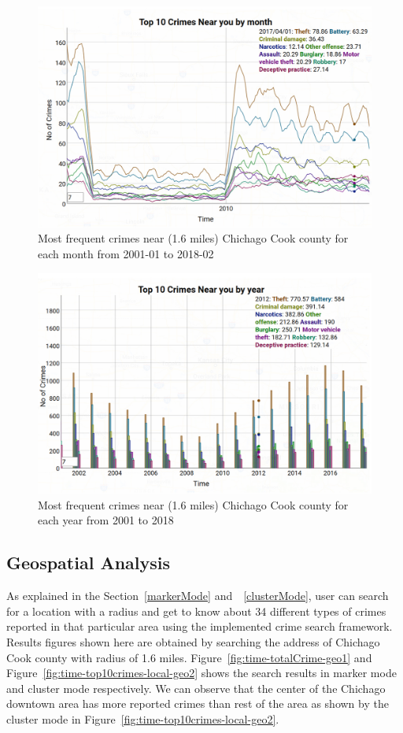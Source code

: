 \begin{figure}[htb]
	\centering\includegraphics[width=\columnwidth]{images/time2.jpg}
	\caption{Most frequent crimes near (1.6 miles) Chichago Cook county for each month from 2001-01 to 2018-02 }\label{fig:time-top10crimes-local}
\end{figure}

\begin{figure}[htb]
	\centering\includegraphics[width=\columnwidth]{images/time3.jpg}
	\caption{Most frequent crimes near (1.6 miles) Chichago Cook county for each year from 2001 to 2018}\label{fig:year-top10crimes-local}
\end{figure}

\subsection{Geospatial Analysis}
As explained in the Section~\ref{markerMode} and~~\ref{clusterMode},
user can search for a location with a radius and get to know about 34
different types of crimes reported in that particular area using the
implemented crime search framework. Results figures shown here are
obtained by searching the address of Chichago Cook county with radius
of 1.6 miles. Figure~\ref{fig:time-totalCrime-geo1} and
Figure~\ref{fig:time-top10crimes-local-geo2} shows the search results
in marker mode and cluster mode respectively. We can observe that the
center of the Chichago downtown area has more reported crimes than
rest of the area as shown by the cluster mode in
Figure~\ref{fig:time-top10crimes-local-geo2}.

